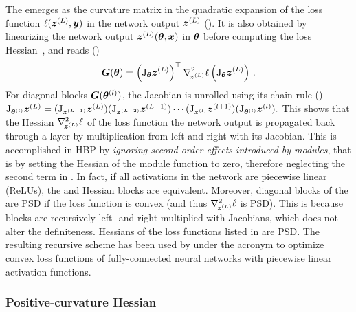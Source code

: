 The \ggn emerges as the curvature matrix in the quadratic expansion of the loss
function $\ell({\bm{z}}^{(L)}, {\bm{y}})$ in the network output ${\bm{z}}^{(L)}$
(). It is also obtained by linearizing the network
output ${\bm{z}}^{(L)}({\bm{\theta}}, {\bm{x}})$ in ${\bm{\theta}}$ before computing the loss
Hessian~\citep{martens2014new}, and reads
()
\begin{align*}
  {\bm{G}}({\bm{\theta}}) =
  \left( \mathrm{J}_{{\bm{\theta}}} {\bm{z}}^{(L)}\right )^\top
  \nabla_{\!{{\bm{z}}^{(L)}}}^{2}\ell
  \left( \mathrm{J}_{{\bm{\theta}}} {\bm{z}}^{(L)}\right )\,.
\end{align*}
For diagonal blocks ${\bm{G}}({\bm{\theta}}^{(l)})$, the Jacobian is unrolled
using its chain rule ()
\begin{math}
  \mathrm{J}_{{\bm{\theta}}^{(l)}}{{\bm{z}}^{(L)}} =
  (\mathrm{J}_{{\bm{z}}^{(L-1)}} {\bm{z}}^{(L)})
  (\mathrm{J}_{{\bm{z}}^{(L-2)}} {\bm{z}}^{(L-1)})
  \cdots
  (\mathrm{J}_{{\bm{z}}^{(l)}} {\bm{z}}^{(l+1)})
  (\mathrm{J}_{{\bm{\theta}}^{(l)}} {\bm{z}}^{(l)}).
\end{math}
This shows that the Hessian $\nabla_{\!{{\bm{z}}^{(L)}}}^{2}\ell$ of the loss function
\wrt the network output is propagated back through a layer by multiplication
from left and right with its Jacobian. This is accomplished in HBP by
\emph{ignoring second-order effects introduced by modules}, that is by setting
the Hessian of the module function to zero, therefore neglecting the second term
in . In fact, if all activations in the
network are piecewise linear (\eg ReLUs), the \ggn and Hessian blocks are
equivalent. Moreover, diagonal blocks of the \ggn are PSD if the loss function
is convex (and thus $\nabla_{\!{{\bm{z}}^{(L)}}}^{2}\ell$ is PSD). This is because
blocks are recursively left- and right-multiplied with Jacobians, which does not
alter the definiteness. Hessians of the loss functions listed in
 are PSD. The resulting recursive scheme has
been used by \citet{botev2017practical} under the acronym \KFRA to optimize
convex loss functions of fully-connected neural networks with piecewise linear
activation functions.

\subsubsection{Positive-curvature Hessian}

